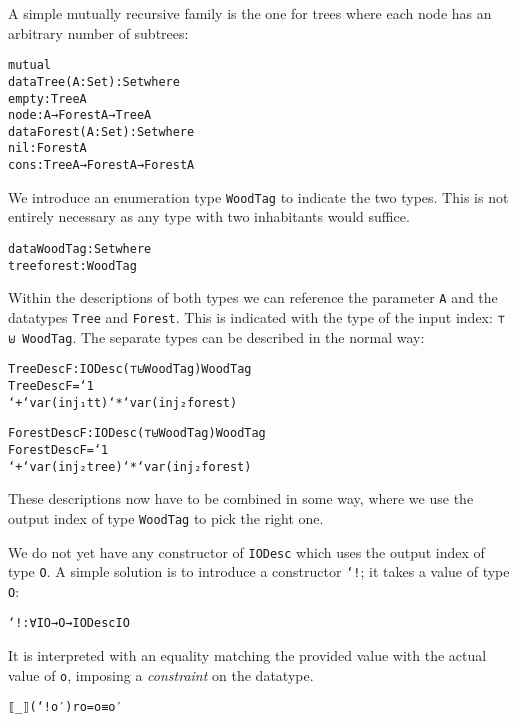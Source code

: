 \begin{example}[Trees]
A simple mutually recursive family is the one for trees where each
node has an arbitrary number of subtrees:

\begin{alltt}
mutual
  data Tree (A : Set) : Set where
    empty : Tree A
    node : A → Forest A → Tree A
  data Forest (A : Set) : Set where
    nil : Forest A
    cons : Tree A → Forest A → Forest A
\end{alltt}

We introduce an enumeration type \texttt{WoodTag} to indicate the two
types.
This is not entirely necessary as any type with two inhabitants would
suffice.

\begin{alltt}
data WoodTag : Set where
  tree forest : WoodTag
\end{alltt}

Within the descriptions of both types we can reference the parameter
\texttt{A} and the datatypes \texttt{Tree} and \texttt{Forest}.
This is indicated with the type of the input index: \texttt{⊤ ⊎
  WoodTag}.
The separate types can be described in the normal way:

\begin{alltt}
TreeDescF : IODesc (⊤ ⊎ WoodTag) WoodTag
TreeDescF = `1
         `+ `var (inj₁ tt) `* `var (inj₂ forest)

ForestDescF : IODesc (⊤ ⊎ WoodTag) WoodTag
ForestDescF = `1
           `+ `var (inj₂ tree) `* `var (inj₂ forest)
\end{alltt}

These descriptions now have to be combined in some way, where we use
the output index of type \texttt{WoodTag} to pick the right one.
\end{example}

We do not yet have any constructor of \texttt{IODesc} which uses the
output index of type \texttt{O}.
A simple solution is to introduce a constructor \texttt{`!}; it takes
a value of type \texttt{O}:

\begin{alltt}
`! : ∀{I O} → O → IODesc I O
\end{alltt}

It is interpreted with an equality matching the provided value with
the actual value of \texttt{o}, imposing a \emph{constraint} on the
datatype.

\begin{alltt}
⟦_⟧ (`! o′) r o = o ≡ o′
\end{alltt}

